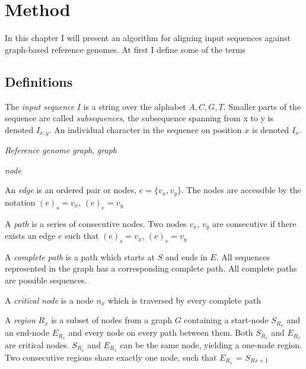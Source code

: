 \documentclass[thesis.tex]{subfiles}
\begin{document}
\chapter{Method}
In this chapter I will present an algorithm for aligning input sequences against graph-based reference genomes. At first I define some of the terms 
\section{Definitions}
\begin{defn}
	The \textit{input sequence} $I$ is a string over the alphabet ${A, C, G, T}$. Smaller parts of the sequence are called \textit{subsequences}, the subsequence spanning from x to y is denoted $I_{x:y}$. An individual character in the sequence on position $x$ is denoted $I_x$.
\end{defn}
\begin{defn}
\textit{Reference genome graph}, \textit{graph}
\end{defn}
\begin{defn}
\textit{node}
\end{defn}
\begin{defn}
	An \textit{edge} is an ordered pair or nodes, $e=\{v_x, v_y\}$. The nodes are accessible by the notation $(e)_s=v_x$, $(e)_e=v_y$
\end{defn}
\begin{defn}
	A \textit{path} is a series of consecutive nodes. Two nodes $v_x$, $v_y$ are consecutive if there exists an edge $e$ such that $(e)_s = v_x$, $(e)_e=v_y$
\end{defn}
\begin{defn}
	A \textit{complete path} is a path which starts at $S$ and ends in $E$. All sequences represented in the graph has a corresponding complete path. All complete paths are possible sequences.
\end{defn}
\begin{defn}
	A \textit{critical node} is a node $n_x$ which is traversed by every complete path
\end{defn}
\begin{defn}
	A \textit{region} $R_x$ is a subset of nodes from a graph $G$ containing a start-node $S_{R_x}$ and an end-node $E_{R_x}$ and every node on every path between them. Both $S_{R_x}$ and $E_{R_x}$ are critical nodes. $S_{R_x}$ and $E_{R_x}$ can be the same node, yielding a one-node region. Two consecutive regions share exactly one node, such that $E_{R_x}$ = $S_{R{x+1}}$
\end{defn}
\end{document}
